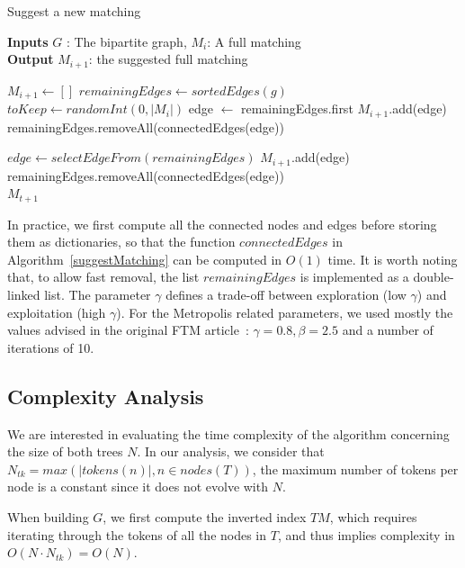 \begin{algorithm}
\caption{Suggest a new matching}
\hspace*{\algorithmicindent} \textbf{Inputs}
$G$ : The bipartite graph, 
$M_i$: A full matching \\
\hspace*{\algorithmicindent} \textbf{Output} 
$M_{i+1}$: the suggested full matching
\begin{algorithmic}
 \State $M_{i+1} \gets [ ]$ 
 \State $remainingEdges \gets sortedEdges(g)$
 \State $toKeep \gets randomInt(0, |M_i|)$
    \State edge $\gets$ remainingEdges.first
 	\State $M_{i+1}$.add(edge)
    \State remainingEdges.removeAll(connectedEdges(edge))
 \EndFor
 
    $edge \gets selectEdgeFrom(remainingEdges)$
    $M_{i+1}$.add(edge)
    remainingEdges.removeAll(connectedEdges(edge))
 \EndWhile \\
 \Return $M_{t+1}$
\end{algorithmic}
\label{suggestMatching}
\end{algorithm}

In practice, we first compute all the connected nodes and edges before storing them as dictionaries, so that the function $connectedEdges$ in Algorithm~\ref{suggestMatching} can be computed in $O(1)$ time.
It is worth noting that, to allow fast removal, the list $remainingEdges$ is implemented as a double-linked list.
The parameter $\gamma$ defines a trade-off between exploration (low $\gamma$) and exploitation (high $\gamma$).
For the Metropolis related parameters, we used mostly the values advised in the original FTM article~\cite{Kumar2011_FTM}: $\gamma = 0.8, \beta = 2.5$ and a number of iterations of 10.

\subsection{Complexity Analysis}\label{sftm:sec:complexity}
We are interested in evaluating the time complexity of the algorithm concerning the size of both trees $N$.
In our analysis, we consider that $N_{tk}=max(|tokens(n)|, n \in nodes(T))$, the maximum number of tokens per node is a constant since it does not evolve with $N$.

When building $G$, we first compute the inverted index $TM$, which requires iterating through the tokens of all the nodes in $T$, and thus implies complexity in $O(N \cdot N_{tk}) = O(N)$.

